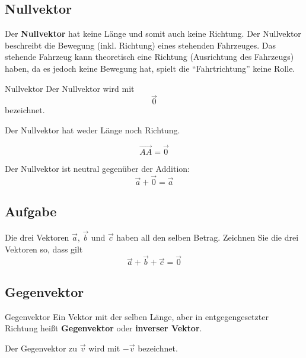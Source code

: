\newpage

\subsection{Nullvektor}

Der \textbf{Nullvektor} hat keine Länge und somit auch keine
Richtung. Der Nullvektor beschreibt \zB die Bewegung (inkl.
Richtung) eines stehenden Fahrzeuges.
Das stehende Fahrzeug kann theoretisch eine Richtung (Ausrichtung des
Fahrzeugs) haben, da es jedoch keine Bewegung hat, spielt die
``Fahrtrichtung'' keine Rolle.

\begin{definition}{Nullvektor}{}
  Der Nullvektor wird mit
  $$\vec{0}$$
  bezeichnet.

  Der Nullvektor hat weder Länge noch Richtung.
\end{definition}

\begin{gesetz}{}{}
  $$\overrightarrow{AA} = \vec{0}$$
  \end{gesetz}

\begin{bemerkung}{}{}
  Der Nullvektor ist neutral gegenüber der Addition:
  $$\vec{a} + \vec{0}  = \vec{a}$$
\end{bemerkung}

\subsection*{Aufgabe}
Die drei Vektoren $\vec{a}$, $\vec{b}$ und $\vec{c}$ haben all den
selben Betrag. Zeichnen Sie die drei Vektoren so, dass
gilt $$\vec{a}+\vec{b}+\vec{c} = \vec{0}$$

\newpage


\subsection{Gegenvektor}

\begin{definition}{Gegenvektor}{}
  Ein Vektor mit der selben Länge, aber in entgegengesetzter Richtung
  heißt \textbf{Gegenvektor} oder \textbf{inverser Vektor}.

  Der Gegenvektor zu $\vec{v}$ wird mit $-\vec{v}$ bezeichnet.
\end{definition}

